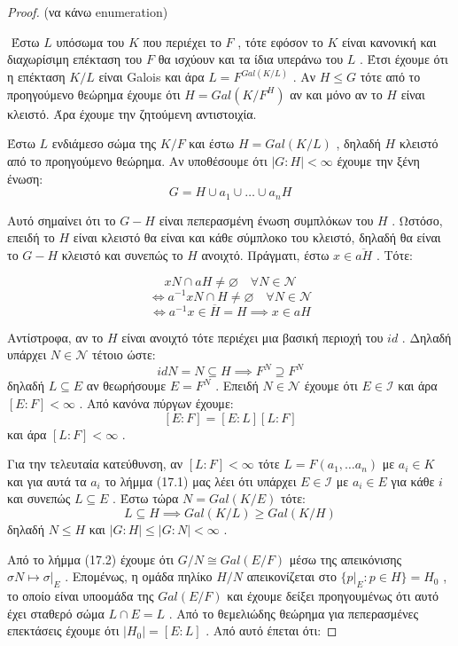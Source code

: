 \documentclass[oneside,a4paper]{article}
\begin{document}
\begin{proof} $ $(να κάνω enumeration)


$ $\newline	
Έστω $L$ υπόσωμα του $K$ που περιέχει το $F$ , τότε εφόσον το $K$ είναι κανονική και διαχωρίσιμη επέκταση του $F$ θα ισχύουν και τα ίδια υπεράνω του $L$ . Έτσι έχουμε ότι η επέκταση $K/L$ είναι Galois και άρα $L = F^{Gal(K/L)}$ . Αν $H \leq G$ τότε από το προηγούμενο θεώρημα έχουμε ότι $H=Gal(K/F^H)$  αν και μόνο αν το $H$ είναι κλειστό. Άρα έχουμε την ζητούμενη αντιστοιχία.

Έστω $L$ ενδιάμεσο σώμα της $K/F$ και έστω $H = Gal(K/L)$ , δηλαδή $H$ κλειστό από το προηγούμενο θεώρημα. Αν υποθέσουμε ότι $|G : H| < \infty$ έχουμε την ξένη ένωση:
$$G = H \cup a_1 \cup \ldots \cup a_n H$$

Αυτό σημαίνει ότι το $G-H$ είναι πεπερασμένη ένωση συμπλόκων του $H$ . Ωστόσο, επειδή το $H$ είναι κλειστό θα είναι και κάθε σύμπλοκο του κλειστό, δηλαδή θα είναι το $G-H$ κλειστό και συνεπώς το $H$ ανοιχτό.
Πράγματι, έστω $x \in \overline{aH}$ . Τότε:

$$xN\cap aH \neq \varnothing \quad \forall N \in \mathcal N$$
$$\iff a^{-1} x N \cap H \neq \varnothing \quad\forall N \in \mathcal N$$
$$\iff a^{-1} x \in \overline H = H \implies x\in aH$$

Αντίστροφα, αν το $H$ είναι ανοιχτό τότε περιέχει μια βασική περιοχή του $id$ . Δηλαδή υπάρχει $N \in \mathcal{N}$ τέτοιο ώστε:
$$id N = N \subseteq H \implies F^N \supseteq F^N$$
δηλαδή $L \subseteq E$ αν θεωρήσουμε $E = F^N$ . Επειδή $N \in \mathcal N$ έχουμε ότι $E \in \mathcal I$ και άρα $[E:F] < \infty$ . Από κανόνα πύργων έχουμε:
$$[E:F]=[E:L][L:F]$$
και άρα $[L:F] < \infty$ .

Για την τελευταία κατεύθυνση, αν $[L:F] <\infty$ τότε $L=F(a_1,\ldots a_n)$ με $a_i \in K$ και για αυτά τα $a_i$ το λήμμα (17.1) μας λέει ότι υπάρχει $E \in \mathcal{I}$ με $a_i \in E$ για κάθε $i$ και συνεπώς $L \subseteq E$ . Έστω τώρα $N = Gal(K/E)$ τότε:
$$L \subseteq H \implies Gal(K/L) \geq Gal(K/H)$$
δηλαδή $N \leq H$ και $| G:H| \leq |G:N| < \infty$ .

Από το λήμμα (17.2) έχουμε ότι $G/N \cong Gal(E/F)$ μέσω της απεικόνισης $\sigma N \mapsto \sigma|_E$ . Επομένως, η ομάδα πηλίκο $H/N$ απεικονίζεται στο $\{p|_E : p \in H\}=H_0$ , το οποίο είναι υποομάδα της $Gal(E/F)$ και έχουμε δείξει προηγουμένως ότι αυτό έχει σταθερό σώμα $L \cap E = L$ . Από το θεμελιώδης θεώρημα για πεπερασμένες επεκτάσεις έχουμε ότι $|H_0 | = [E:L]$ . Από αυτό έπεται ότι:


\end{proof}
\end{document}
